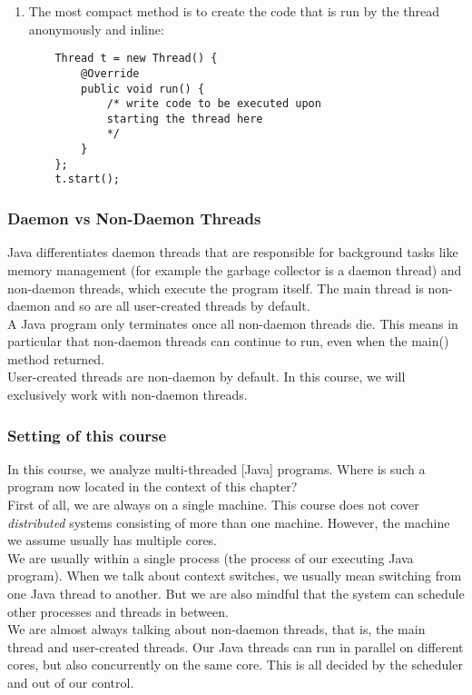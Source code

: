 \documentclass[main]{subfiles}
\begin{document}
\begin{enumerate}
    \item The most compact method is to create the code that is run by the thread anonymously and inline:
    \begin{verbatim}
    Thread t = new Thread() {
        @Override
        public void run() {
            /* write code to be executed upon
            starting the thread here
            */
        }
    };
    t.start();
    \end{verbatim}
\end{enumerate}

\subsubsection{Daemon vs Non-Daemon Threads}
Java differentiates daemon threads that are responsible for background tasks like memory management (for example the garbage collector is a daemon thread) and non-daemon threads, which execute the program itself. The main thread is non-daemon and so are all user-created threads by default.\\
A Java program only terminates once all non-daemon threads die. This means in particular that non-daemon threads can continue to run, even when the main() method returned.\\
User-created threads are non-daemon by default. In this course, we will exclusively work with non-daemon threads.

\subsubsection{Setting of this course}
In this course, we analyze multi-threaded [Java] programs. Where is such a program now located in the context of this chapter?\\
First of all, we are always on a single machine. This course does not cover \textit{distributed} systems consisting of more than one machine. However, the machine we assume usually has multiple cores.\\
We are usually within a single process (the process of our executing Java program). When we talk about context switches, we usually mean switching from one Java thread to another. But we are also mindful that the system can schedule other processes and threads in between.\\
We are almost always talking about non-daemon threads, that is, the main thread and user-created threads. Our Java threads can run in parallel on different cores, but also concurrently on the same core. This is all decided by the scheduler and out of our control.
\end{document}
